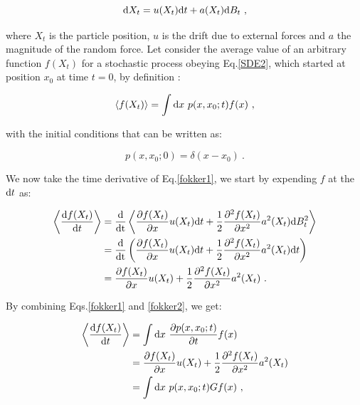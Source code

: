 \begin{equation}
	\textnormal{d}X_t = u(X_t) \textnormal{d}t + a(X_t)\textnormal{d}B_t ~,
	\label{SDE2}
\end{equation}

where $X_t$ is the particle position,  $u$ is the drift due to external forces and $a$ the magnitude of the random force. Let consider the average value of an arbitrary function $f(X_t)$ for a stochastic process obeying Eq.\ref{SDE2}, which started at position $x_0$ at time $t=0$, by definition \cite{le_bellac_equilibrium_2004}:

\begin{equation}
	\langle f(X_t) \rangle = \int \textnormal{d}x ~ p(x, x_0 ; t) f(x) ~,
	\label{fokker1}
\end{equation}

with the initial conditions that can be written as:

\begin{equation}
	p(x, x_0; 0) = \delta (x - x_0) ~.
\end{equation}

We now take the time derivative of Eq.\ref{fokker1}, we start by expending $ f$ at the $\textnormal{d}t$ as:

\begin{equation}
	\begin{aligned}
		\left\langle \frac{\textnormal{d}f(X_t)}{\textnormal{d}t} \right\rangle  &= \frac{\textnormal{d}}{\textnormal{dt}}\left\langle   \frac{\partial f(X_t)}{\partial x} u(X_t) \textnormal{d}t + \frac{1}{2} \frac{\partial^2 f(X_t)}{\partial x^2} a^2 (X_t) \textnormal{d}B_t^2   \right\rangle \\
		& =  \frac{\textnormal{d}}{\textnormal{dt}} \left( \frac{\partial f(X_t)}{\partial x} u(X_t) \textnormal{d}t + \frac{1}{2} \frac{\partial^2 f(X_t)}{\partial x^2} a^2 (X_t) \textnormal{d}t \right) \\
		& = \frac{\partial f(X_t)}{\partial x} u(X_t) + \frac{1}{2} \frac{\partial^2 f(X_t)}{\partial x^2} a^2 (X_t) ~.
	\end{aligned}
	\label{fokker2}
\end{equation}

By combining Eqs.\ref{fokker1} and \ref{fokker2}, we get:

\begin{equation}
	\begin{aligned}
		\left\langle \frac{\textnormal{d}f(X_t)}{\textnormal{d}t} \right\rangle &= \int \textnormal{d} x ~\frac{\partial p(x, x_0 ; t) }{\partial t} f(x) \\
		& =  \frac{\partial f(X_t)}{\partial x} u(X_t) + \frac{1}{2} \frac{\partial^2 f(X_t)}{\partial x^2} a^2 (X_t) \\
		& = \int \textnormal{d}x ~ p(x, x_0 ; t) G f(x) ~,
	\end{aligned}
\end{equation}

